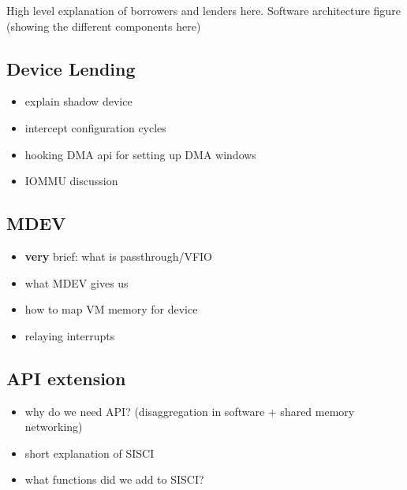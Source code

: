 High level explanation of borrowers and lenders here.
Software architecture figure (showing the different components here)

\subsection{Device Lending}
\begin{itemize}
    \item explain shadow device
    \item intercept configuration cycles
    \item hooking DMA api for setting up DMA windows
    \item IOMMU discussion
\end{itemize}

\subsection{MDEV}
\begin{itemize}
    \item \textbf{very} brief: what is passthrough/VFIO
    \item what MDEV gives us
    \item how to map VM memory for device
    \item relaying interrupts
\end{itemize}

\subsection{API extension}
\begin{itemize}
    \item why do we need API? (disaggregation in software + shared memory networking)
    \item short explanation of SISCI
    \item what functions did we add to SISCI?
\end{itemize}

